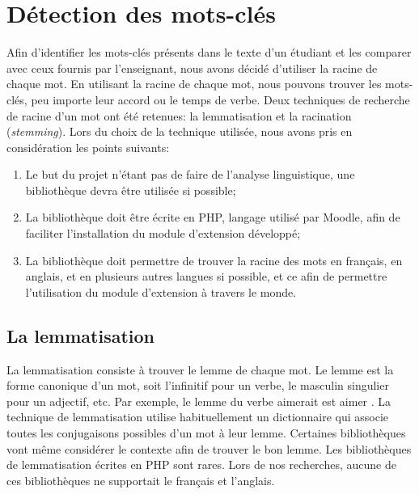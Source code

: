 \chapter{D\'etection des mots-cl\'es}
\label{chap:keywords}
Afin d'identifier les mots-cl\'es pr\'esents dans le texte d'un \'etudiant et les comparer avec ceux fournis par l'enseignant, nous avons d\'ecid\'e d'utiliser la racine de chaque mot.
En utilisant la racine de chaque mot, nous pouvons trouver les mots-cl\'es, peu importe leur accord ou le temps de verbe.
Deux techniques de recherche de racine d'un mot ont \'et\'e retenues: la lemmatisation et la racination (\textit{stemming}).
Lors du choix de la technique utilis\'ee, nous avons pris en consid\'eration les points suivants:
\begin{enumerate}
  \item Le but du projet n'\'etant pas de faire de l'analyse linguistique, une biblioth\`eque devra \^etre utilis\'ee si possible;
  \item La biblioth\`eque doit \^etre \'ecrite en PHP, langage utilis\'e par Moodle, afin de faciliter l'installation du module d'extension d\'evelopp\'e;
  \item La biblioth\`eque doit permettre de trouver la racine des mots en fran\c{c}ais, en anglais, et en plusieurs autres langues si possible, et ce afin de permettre l'utilisation du module d'extension \`a travers le monde.
\end{enumerate}
\section{La lemmatisation}
La lemmatisation consiste \`a trouver le lemme de chaque mot.
Le lemme est la forme canonique d'un mot, soit l'infinitif pour un verbe, le masculin singulier pour un adjectif, etc.
Par exemple, le lemme du verbe \og aimerait \fg{} est \og aimer \fg{}.
La  technique de lemmatisation utilise habituellement un dictionnaire qui associe toutes les conjugaisons possibles d'un mot \`a leur lemme.
Certaines biblioth\`eques vont m\^eme consid\'erer le contexte afin de trouver le bon lemme.
Les biblioth\`eques de lemmatisation \'ecrites en PHP sont rares.
Lors de nos recherches, aucune de ces biblioth\`eques ne supportait le fran\c{c}ais et l'anglais.
